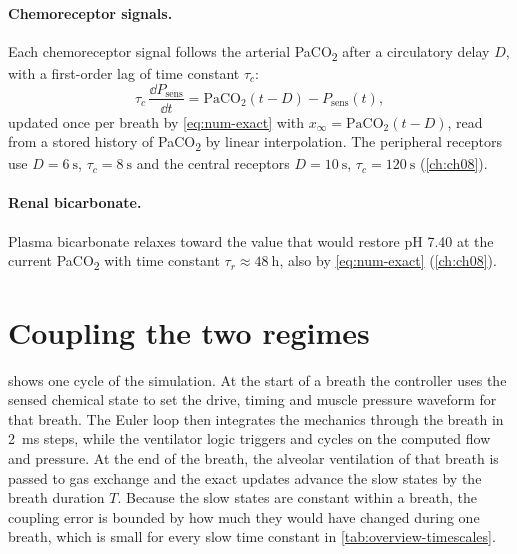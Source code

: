 \paragraph{Chemoreceptor signals.} Each chemoreceptor signal follows the arterial PaCO\textsubscript{2} after a circulatory delay $D$, with a first-order lag of time constant $\tau_c$:
\begin{equation}
\tau_c\,\frac{\dd P_{\mathrm{sens}}}{\dd t} = \mathrm{PaCO_2}(t-D) - P_{\mathrm{sens}}(t),
\label{eq:num-chem}
\end{equation}
updated once per breath by \cref{eq:num-exact} with $x_\infty = \mathrm{PaCO_2}(t-D)$, read from a stored history of PaCO\textsubscript{2} by linear interpolation. The peripheral receptors use $D = \SI{6}{\second}$, $\tau_c = \SI{8}{\second}$ and the central receptors $D = \SI{10}{\second}$, $\tau_c = \SI{120}{\second}$ (\cref{ch:ch08}).

\paragraph{Renal bicarbonate.} Plasma bicarbonate relaxes toward the value that would restore pH 7.40 at the current PaCO\textsubscript{2} with time constant $\tau_r \approx \SI{48}{\hour}$, also by \cref{eq:num-exact} (\cref{ch:ch08}).

\section{Coupling the two regimes}
\label{sec:num-coupling}
 shows one cycle of the simulation. At the start of a breath the controller uses the sensed chemical state to set the drive, timing and muscle pressure waveform for that breath. The Euler loop then integrates the mechanics through the breath in \SI{2}{\milli\second} steps, while the ventilator logic triggers and cycles on the computed flow and pressure. At the end of the breath, the alveolar ventilation of that breath is passed to gas exchange and the exact updates advance the slow states by the breath duration $T$. Because the slow states are constant within a breath, the coupling error is bounded by how much they would have changed during one breath, which is small for every slow time constant in \cref{tab:overview-timescales}.

